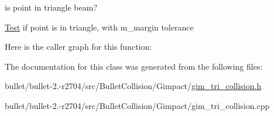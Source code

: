 is point in triangle beam? 

\hyperlink{class_test}{Test} if point is in triangle, with m\+\_\+margin tolerance 

Here is the caller graph for this function\+:




The documentation for this class was generated from the following files\+:\begin{DoxyCompactItemize}
\item 
bullet/bullet-\/2.-\/r2704/src/\+Bullet\+Collision/\+Gimpact/\hyperlink{gim__tri__collision_8h}{gim\+\_\+tri\+\_\+collision.\+h}\item 
bullet/bullet-\/2.-\/r2704/src/\+Bullet\+Collision/\+Gimpact/gim\+\_\+tri\+\_\+collision.\+cpp\end{DoxyCompactItemize}
